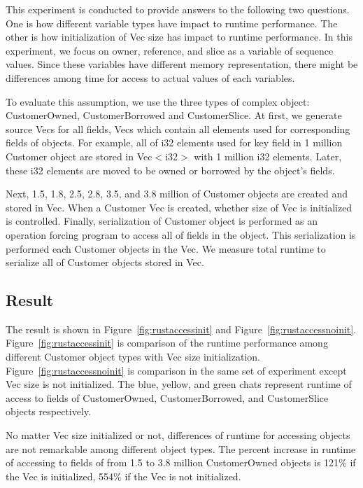 This experiment is conducted to provide answers to the following two questions. One is how different variable types have impact to runtime performance.
The other is how initialization of Vec size has impact to runtime performance. 
In this experiment, we focus on owner, reference, and slice as a variable of sequence values. 
Since these variables have different memory representation, there might be differences among time for access to actual values of each variables.

To evaluate this assumption, we use the three types of complex object: CustomerOwned, CustomerBorrowed and CustomerSlice. 
At first, we generate source Vecs for all fields, Vecs which contain all elements used for corresponding fields of objects.
For example, all of i32 elements used for key field in 1 million Customer object are stored in Vec$<$i32$>$ with 1 million i32 elements. 
Later, these i32 elements are moved to be owned or borrowed by the object's fields.

Next, 1.5, 1.8, 2.5, 2.8, 3.5, and 3.8 million of Customer objects are created and stored in Vec. 
When a Customer Vec is created, whether size of Vec is initialized is controlled. 
Finally, serialization of Customer object is performed as an operation forcing program to access all of fields in the object.
This serialization is performed each Customer objects in the Vec. We measure total runtime to serialize all of Customer objects 
stored in Vec. 

\subsection{Result}
\label{sec:history}
The result is shown in Figure~\ref{fig:rustaccessinit} and Figure~\ref{fig:rustaccessnoinit}.
Figure~\ref{fig:rustaccessinit} is comparison of the runtime performance among different Customer object types with Vec size initialization.
Figure~\ref{fig:rustaccessnoinit} is comparison in the same set of experiment except Vec size is not initialized. 
The blue, yellow, and green chats represent runtime of access to fields of CustomerOwned, CustomerBorrowed, and CustomerSlice objects respectively.

No matter Vec size initialized or not, differences of runtime for accessing objects are not remarkable among different object types. 
The percent increase in runtime of accessing to fields of from 1.5 to 3.8 million CustomerOwned objects is 121\% if the Vec is initialized, 554\% if the Vec is not initialized.

